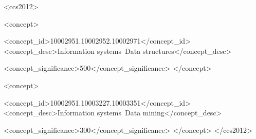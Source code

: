 \documentclass{sig-alternate-05-2015}
\begin{document}
%
%
\begin{CCSXML}

<ccs2012>


<concept>

<concept_id>10002951.10002952.10002971</concept_id>
 <concept_desc>Information systems~Data structures</concept_desc>

<concept_significance>500</concept_significance>
</concept>

<concept>

<concept_id>10002951.10003227.10003351</concept_id>
 <concept_desc>Information systems~Data mining</concept_desc>

<concept_significance>300</concept_significance>
</concept>
</ccs2012>

\end{CCSXML}


%
%

%
%
\printccsdesc













%
%

\end{document}
